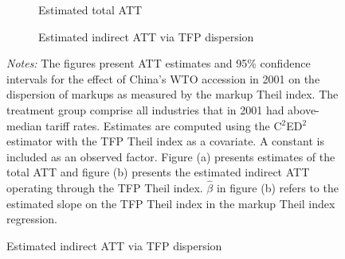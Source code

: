 \documentclass[12pt,fleqn]{article}
\begin{document}
\begin{figure}
    \caption{Estimated ATTs of China's WTO accession in 2001 on the markup Theil index.}
    \label{fig:trade}

    \begin{subfigure}[b]{\textwidth}
        \caption{Estimated total ATT}
        
    \end{subfigure}

    \begin{subfigure}[b]{\textwidth}
        \caption{Estimated indirect ATT via TFP dispersion}
        
    \end{subfigure}

    {\footnotesize\emph{Notes:} The figures present ATT estimates and 95\% confidence intervals for the effect of China's WTO accession in 2001 on the dispersion of markups as measured by the markup Theil index. The treatment group comprise all industries that in 2001 had above-median tariff rates. Estimates are computed using the C$^2$ED$^2$ estimator with the TFP Theil index as a covariate. A constant is included as an observed factor. Figure (a) presents estimates of the total ATT and figure (b) presents the estimated indirect ATT operating through the TFP Theil index. $\hat{\beta}$ in figure (b) refers to the estimated slope on the TFP Theil index in the markup Theil index regression.}
\end{figure}
\end{document}
